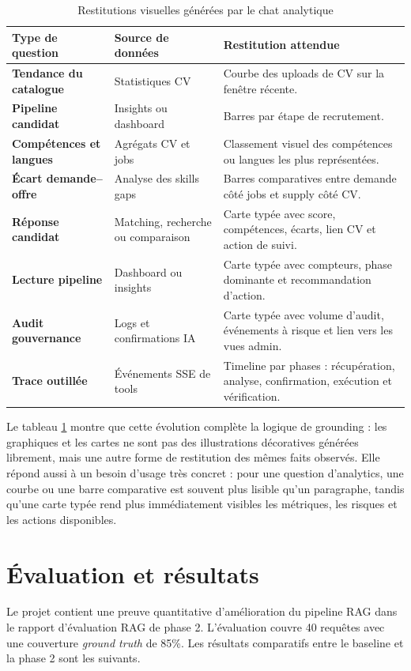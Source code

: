 \begin{table}[H]
  \centering
  \caption{\label{tab:chat-visual-restitution}Restitutions visuelles générées par le chat analytique}
  \begin{tabularx}{\textwidth}{>{\bfseries}p{3.2cm}p{3.6cm}X}
    \toprule
    Type de question & Source de données & Restitution attendue \\
    \midrule
    Tendance du catalogue & Statistiques CV & Courbe des uploads de CV sur la fenêtre récente. \\
    Pipeline candidat & Insights ou dashboard & Barres par étape de recrutement. \\
    Compétences et langues & Agrégats CV et jobs & Classement visuel des compétences ou langues les plus représentées. \\
    Écart demande--offre & Analyse des skills gaps & Barres comparatives entre demande côté jobs et supply côté CV. \\
    Réponse candidat & Matching, recherche ou comparaison & Carte typée avec score, compétences, écarts, lien CV et action de suivi. \\
    Lecture pipeline & Dashboard ou insights & Carte typée avec compteurs, phase dominante et recommandation d'action. \\
    Audit gouvernance & Logs et confirmations IA & Carte typée avec volume d'audit, événements à risque et lien vers les vues admin. \\
    Trace outillée & Événements SSE de tools & Timeline par phases : récupération, analyse, confirmation, exécution et vérification. \\
    \bottomrule
  \end{tabularx}
\end{table}

Le tableau \ref{tab:chat-visual-restitution} montre que cette évolution complète la logique de grounding : les graphiques et les cartes ne sont pas des illustrations décoratives générées librement, mais une autre forme de restitution des mêmes faits observés. Elle répond aussi à un besoin d'usage très concret : pour une question d'analytics, une courbe ou une barre comparative est souvent plus lisible qu'un paragraphe, tandis qu'une carte typée rend plus immédiatement visibles les métriques, les risques et les actions disponibles.

\section{Évaluation et résultats}
Le projet contient une preuve quantitative d'amélioration du pipeline RAG dans le rapport d'évaluation RAG de phase 2. L'évaluation couvre 40 requêtes avec une couverture \textit{ground truth} de 85\%. Les résultats comparatifs entre le baseline et la phase 2 sont les suivants.

